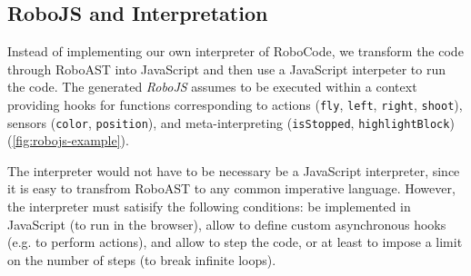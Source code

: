 
\subsection{RoboJS and Interpretation}
\label{sec:robomission-robojs}

Instead of implementing our own interpreter of RoboCode,
we transform the code through RoboAST into JavaScript
and then use a JavaScript interpeter %
to run the code.
The generated \emph{RoboJS} %
assumes to be executed within a
context providing hooks for functions corresponding to actions (\texttt{fly}, \texttt{left}, \texttt{right}, \texttt{shoot}),
sensors (\texttt{color}, \texttt{position}),
and meta-interpreting (\texttt{isStopped}, \texttt{highlightBlock})
(\cref{fig:robojs-example}).

The interpreter would not have to be necessary be a JavaScript interpreter,
since it is easy to transfrom RoboAST to any common imperative language.
However, the interpreter must satisify the following conditions:
be implemented in JavaScript (to run in the browser),
allow to define custom asynchronous hooks
(e.g. to perform actions),
and allow to step the code, or at least to impose a limit on
the number of steps %
(to break infinite loops).



